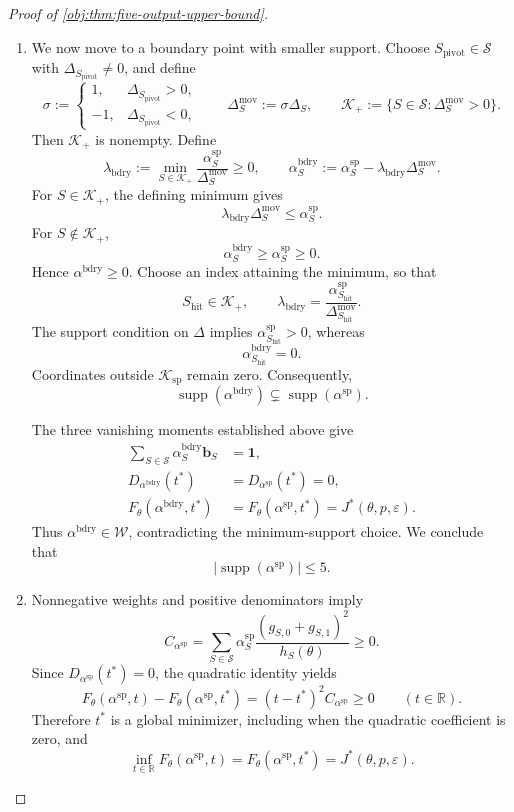 \documentclass[11pt]{article}
\begin{document}
\begin{proof}[Proof of \cref{obj:thm:five-output-upper-bound}]
\begin{enumerate}
\item
We now move to a boundary point with smaller support.
Choose \(S_{\mathrm{pivot}}\in\mathcal S\) with
\(\Delta_{S_{\mathrm{pivot}}}\ne0\), and define
\[
\sigma:=
\begin{cases}
1,&\Delta_{S_{\mathrm{pivot}}}>0,\\
-1,&\Delta_{S_{\mathrm{pivot}}}<0,
\end{cases}
\qquad
\Delta^{\mathrm{mov}}_S:=\sigma\Delta_S,
\qquad
\mathcal K_+:=\{S\in\mathcal S:\Delta^{\mathrm{mov}}_S>0\}.
\]
Then \(\mathcal K_+\) is nonempty. Define
\[
\lambda_{\mathrm{bdry}}
:=
\min_{S\in\mathcal K_+}
\frac{\alpha^{\mathrm{sp}}_S}{\Delta^{\mathrm{mov}}_S}
\ge0,
\qquad
\alpha^{\mathrm{bdry}}_S
:=
\alpha^{\mathrm{sp}}_S
-\lambda_{\mathrm{bdry}}\Delta^{\mathrm{mov}}_S.
\]
For \(S\in\mathcal K_+\), the defining minimum gives
\[
\lambda_{\mathrm{bdry}}\Delta^{\mathrm{mov}}_S
\le\alpha^{\mathrm{sp}}_S.
\]
For \(S\notin\mathcal K_+\),
\[
\alpha^{\mathrm{bdry}}_S
\ge\alpha^{\mathrm{sp}}_S\ge0.
\]
Hence \(\alpha^{\mathrm{bdry}}\ge0\).
Choose an index attaining the minimum, so that
\[
S_{\mathrm{hit}}\in\mathcal K_+,
\qquad
\lambda_{\mathrm{bdry}}
=
\frac{\alpha^{\mathrm{sp}}_{S_{\mathrm{hit}}}}
{\Delta^{\mathrm{mov}}_{S_{\mathrm{hit}}}}.
\]
The support condition on \(\Delta\) implies
\(\alpha^{\mathrm{sp}}_{S_{\mathrm{hit}}}>0\), whereas
\[
\alpha^{\mathrm{bdry}}_{S_{\mathrm{hit}}}=0.
\]
Coordinates outside \(\mathcal K_{\mathrm{sp}}\) remain zero.
Consequently,
\[
\operatorname{supp}(\alpha^{\mathrm{bdry}})
\subsetneq\operatorname{supp}(\alpha^{\mathrm{sp}}).
\]

The three vanishing moments established above give
\[
\begin{aligned}
\sum_{S\in\mathcal S}\alpha^{\mathrm{bdry}}_S\mathbf b_S
&=\mathbf1,\\
D_{\alpha^{\mathrm{bdry}}}(t^*)
&=D_{\alpha^{\mathrm{sp}}}(t^*)=0,\\
F_\theta(\alpha^{\mathrm{bdry}},t^*)
&=F_\theta(\alpha^{\mathrm{sp}},t^*)
=J^*(\theta,p,\varepsilon).
\end{aligned}
\]
Thus \(\alpha^{\mathrm{bdry}}\in\mathcal W\), contradicting the
minimum-support choice. We conclude that
\[
|\operatorname{supp}(\alpha^{\mathrm{sp}})|\le5.
\]

\item
Nonnegative weights and positive denominators imply
\[
C_{\alpha^{\mathrm{sp}}}
=
\sum_{S\in\mathcal S}
\alpha^{\mathrm{sp}}_S
\frac{(g_{S,0}+g_{S,1})^2}{h_S(\theta)}
\ge0.
\]
Since \(D_{\alpha^{\mathrm{sp}}}(t^*)=0\), the quadratic identity yields
\[
F_\theta(\alpha^{\mathrm{sp}},t)
-F_\theta(\alpha^{\mathrm{sp}},t^*)
=
(t-t^*)^2C_{\alpha^{\mathrm{sp}}}\ge0
\qquad(t\in\mathbb R).
\]
Therefore \(t^*\) is a global minimizer, including when the quadratic
coefficient is zero, and
\[
\inf_{t\in\mathbb R}F_\theta(\alpha^{\mathrm{sp}},t)
=
F_\theta(\alpha^{\mathrm{sp}},t^*)
=
J^*(\theta,p,\varepsilon).
\]


\end{enumerate}
\end{proof}
\end{document}
